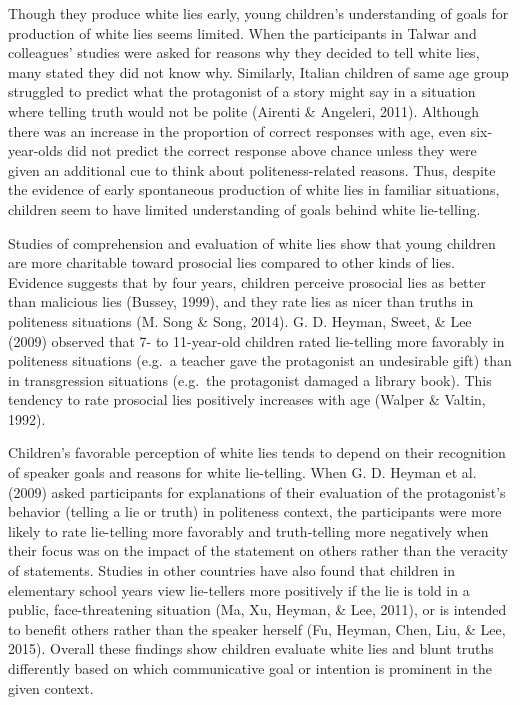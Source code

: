 \documentclass[oneside]{report}
\begin{document}
Though they produce white lies early, young children's understanding of
goals for production of white lies seems limited. When the participants
in Talwar and colleagues' studies were asked for reasons why they
decided to tell white lies, many stated they did not know why.
Similarly, Italian children of same age group struggled to predict what
the protagonist of a story might say in a situation where telling truth
would not be polite (Airenti \& Angeleri, 2011). Although there was an
increase in the proportion of correct responses with age, even
six-year-olds did not predict the correct response above chance unless
they were given an additional cue to think about politeness-related
reasons. Thus, despite the evidence of early spontaneous production of
white lies in familiar situations, children seem to have limited
understanding of goals behind white lie-telling.

Studies of comprehension and evaluation of white lies show that young
children are more charitable toward prosocial lies compared to other
kinds of lies. Evidence suggests that by four years, children perceive
prosocial lies as better than malicious lies (Bussey, 1999), and they
rate lies as nicer than truths in politeness situations (M. Song \&
Song, 2014). G. D. Heyman, Sweet, \& Lee (2009) observed that 7- to
11-year-old children rated lie-telling more favorably in politeness
situations (e.g.~a teacher gave the protagonist an undesirable gift)
than in transgression situations (e.g.~the protagonist damaged a library
book). This tendency to rate prosocial lies positively increases with
age (Walper \& Valtin, 1992).

Children's favorable perception of white lies tends to depend on their
recognition of speaker goals and reasons for white lie-telling. When G.
D. Heyman et al. (2009) asked participants for explanations of their
evaluation of the protagonist's behavior (telling a lie or truth) in
politeness context, the participants were more likely to rate
lie-telling more favorably and truth-telling more negatively when their
focus was on the impact of the statement on others rather than the
veracity of statements. Studies in other countries have also found that
children in elementary school years view lie-tellers more positively if
the lie is told in a public, face-threatening situation (Ma, Xu, Heyman,
\& Lee, 2011), or is intended to benefit others rather than the speaker
herself (Fu, Heyman, Chen, Liu, \& Lee, 2015). Overall these findings
show children evaluate white lies and blunt truths differently based on
which communicative goal or intention is prominent in the given context.
\end{document}
